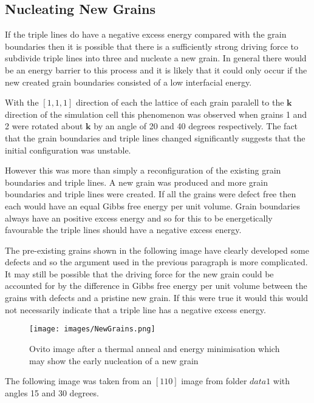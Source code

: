 \documentclass[12pt,a4paper]{book}
\begin{document}
\subsection{Nucleating New Grains}

If the triple lines do have a negative excess energy compared with the grain boundaries then it is possible that there is a sufficiently strong driving force to subdivide triple lines into three and nucleate a new grain. In general there would be an energy barrier to this process and it is likely that it could only occur if the new created grain boundaries consisted of a low interfacial energy.

With the $[1,1,1]$ direction of each the lattice of each grain paralell to the $\mathbf{k}$ direction of the simulation cell this phenomenon was observed when grains 1 and 2 were rotated about $\mathbf{k}$  by an angle of 20 and 40 degrees respectively. The fact that the grain boundaries and triple lines changed significantly suggests that the initial configuration was unstable. 

However this was more than simply a reconfiguration of the existing grain boundaries and triple lines. A new grain was produced and more grain boundaries and triple lines were created. If all the grains were defect free then each would have an equal Gibbs free energy per unit volume. Grain boundaries always have an positive excess energy and so for this to be energetically favourable the triple lines should have a negative excess energy.

The pre-existing grains shown in the following image have clearly developed some defects and so the argument used in the previous paragraph is more complicated. It may still be possible that the driving force for the new grain could be accounted for by the difference in Gibbs free energy per unit volume between the grains with defects and a pristine new grain. If this were true it would this would not necessarily indicate that a triple line has a negative excess energy.

\begin{figure}
	\centering
	\texttt{[image: images/NewGrains.png]} 
	\label{fig:NewGrains}
	\caption{Ovito image after a thermal anneal and energy minimisation which may show the early nucleation of a new grain}
\end{figure}

The following image was taken from an $[1 1 0]$ image from folder $data1$ with angles 15 and 30 degrees.
\end{document}
